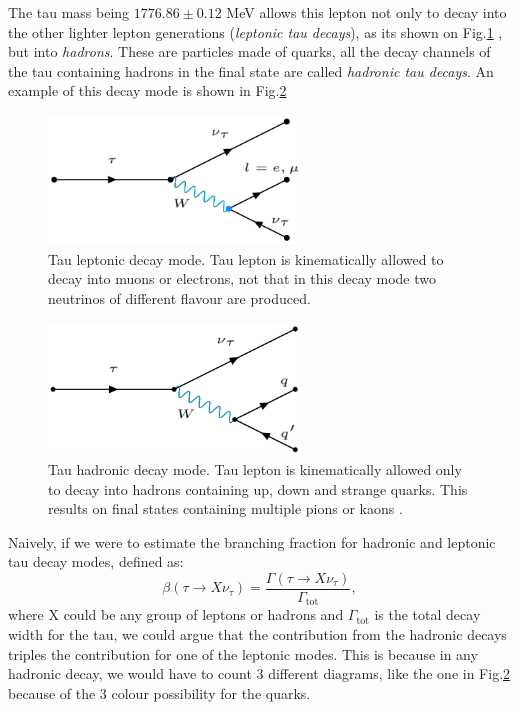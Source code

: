 The tau mass being $1776.86 \pm 0.12$ MeV allows this lepton not only to decay into the other lighter lepton generations (\textit{leptonic tau decays}), as its shown on Fig.\ref{Fig1}  , but into \textit{hadrons}. These are particles made of quarks, all the decay channels of the tau containing hadrons in the final state are called \textit{hadronic tau decays}. An example of this decay mode is shown in Fig.\ref{Fig2}
\begin{figure}[h]
	\centering
	\includegraphics[width=0.6\textwidth]{figures/Fig1}
	\caption{Tau leptonic decay mode. Tau lepton is kinematically allowed to decay into muons or electrons, not that in this decay mode two neutrinos of different flavour are produced.}
	\label{Fig1}
\end{figure}
\begin{figure}[h]
	\centering
	\includegraphics[width=0.6\textwidth]{figures/Fig2}
	\caption{Tau hadronic decay mode. Tau lepton is kinematically allowed only to decay into hadrons containing up, down and strange quarks. This results on final states containing multiple pions or kaons \cite{Davier_2006}.}
	\label{Fig2}
\end{figure}
Naively, if we were to estimate the branching fraction for hadronic and leptonic tau decay modes, defined as:
\begin{equation}
	\beta(\tau\to X\nu_\tau)=\frac{\Gamma(\tau\to X\nu_\tau)}{\Gamma_{\text{tot}}},
\end{equation}
where X could be any group of leptons or hadrons and $\Gamma_{\text{tot}}$ is the total decay width for the tau, we could argue that the contribution from the hadronic decays triples the contribution for one of the leptonic modes. This is because in any hadronic decay, we would have to count 3 different diagrams, like the one in Fig.\ref{Fig2} because of the 3 colour possibility for the quarks.

